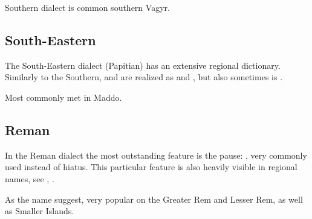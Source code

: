 Southern dialect is common southern Vagyr.

\subsection{South-Eastern}

The South-Eastern dialect (Papitian) has an extensive regional dictionary.
Similarly to the Southern,  and  are realized as  and ,
but also sometimes  is .

Most commonly met in Maddo.

\subsection{Reman}

In the Reman dialect the most outstanding feature is the pause: \xt{|}, very
commonly used instead of hiatus. This particular feature is also heavily visible
in regional names, see , .

As the name suggest, very popular on the Greater Rem and Lesser Rem, as well as
Smaller Islands.
